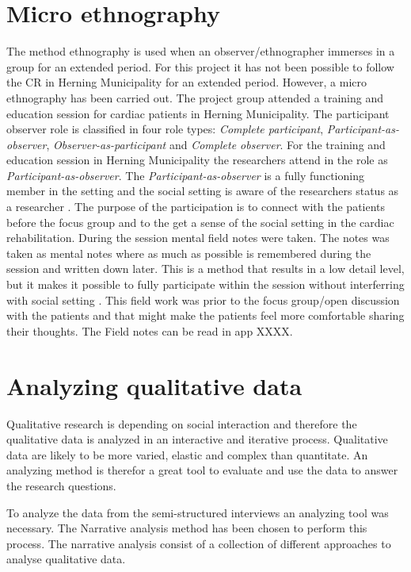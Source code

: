\section{Micro ethnography} \label{ethnography}
The method ethnography is used when an observer/ethnographer immerses in a group for an extended period. For this project it has not been possible to follow the CR in Herning Municipality for an extended period. However, a micro ethnography has been carried out. The project group attended a training and education session for cardiac patients in Herning Municipality. The participant observer role is classified in four role types: \textit{Complete participant}, \textit{Participant-as-observer}, \textit{Observer-as-participant} and \textit{Complete observer}. For the training and education session in Herning Municipality the researchers attend in the role as \textit{Participant-as-observer}. The \textit{Participant-as-observer} is a fully functioning member in the setting and the social setting is aware of the researchers status as a researcher \cite{gold1958roles}. The purpose of the participation is to connect with the patients before the focus group and to the get a sense of the social setting in the cardiac rehabilitation. During the session mental field notes were taken. The notes was taken as mental notes where as much as possible is remembered during the session and written down later. This is a method that results in a low detail level, but it makes it possible to fully participate within the session without interferring with social setting \cite{lofland1995analyzing}. This field work was prior to the focus group/open discussion with the patients and that might make the patients feel more comfortable sharing their thoughts. The Field notes can be read in app XXXX. 

\section{Analyzing qualitative data}

Qualitative research is depending on social interaction and therefore the qualitative data is analyzed in an interactive and iterative process. Qualitative data are likely to be more varied, elastic and complex than quantitate. An analyzing method is therefor a great tool to evaluate and use the data to answer the research questions. 

To analyze the data from the semi-structured interviews an analyzing tool was necessary. The Narrative analysis method has been chosen to perform this process. The narrative analysis consist of a collection of different approaches to analyse qualitative data. 

